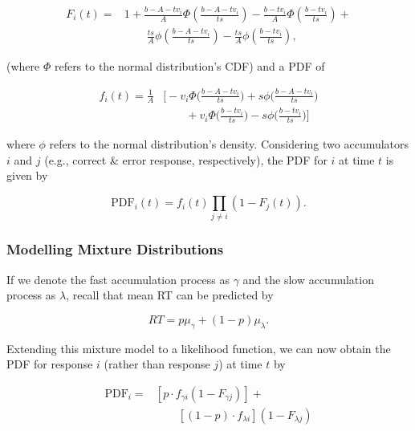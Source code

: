 \documentclass[a4paper, jou, natbib]{apa6}
\begin{document}
\begin{equation}
\begin{aligned}
F_{i}(t) = & 1 + \frac{b - A - tv_{i}}{A} \Phi\left(\frac{b - A - tv_{i}}{ts}\right) - 
\frac{b - tv_{i}}{A} \Phi\left(\frac{b - tv_{i}}{ts}\right) + \\ 
&\qquad \frac{ts}{A} \phi \left(\frac{b - A - tv_{i}}{ts}\right) - \frac{ts}{A} \phi \left(\frac{b - tv_{i}}{ts}\right),
\end{aligned}
\label{eq:lbaCDF}
\end{equation}

\noindent (where $\Phi$ refers to the normal distribution's CDF) and a PDF of 

\begin{equation}
\begin{aligned}
f_{i}(t) = \frac{1}{A} & \Biggl[-v_{i}\Phi \Biggl(\frac{b - A - tv_{i}}{ts}\Biggr) + s\phi\Biggl(\frac{b - A - tv_{i}}{ts}\Biggr) \\
&\qquad + v_{i}\Phi \Biggl(\frac{b - tv_{i}}{ts}\Biggr) - s\phi\Biggl(\frac{b - tv_{i}}{ts}\Biggr)\Biggr] 
\end{aligned}
\label{eq:lbaPDF}
\end{equation}

\noindent where $\phi$ refers to the normal distribution's density. Considering two accumulators $i$ and $j$ (e.g., correct \& error response, respectively), the PDF for $i$ at time $t$ is given by

\begin{equation}
\mbox{PDF}_{i}(t) = f_{i}(t) \prod_{j \neq i} \left(1 - F_{j}(t)\right).
\label{eq:defectivePDF}
\end{equation}


\subsubsection{Modelling Mixture Distributions}
If we denote the fast accumulation process as $\gamma$ and the slow accumulation process as $\lambda$, recall that mean RT can be predicted by

\begin{equation}
RT = p\mu_{\gamma} + (1 - p)\mu_{\lambda}.
\end{equation}

Extending this mixture model to a likelihood function, we can now obtain the PDF for response $i$ (rather than response $j$) at time $t$ by 

\begin{equation}
\begin{aligned}
\mbox{PDF}_{i} = &\left[p \cdot f_{\gamma i}(1 - F_{\gamma j})\right] + \\ 
&\qquad \left[(1 - p) \cdot f_{\lambda i}\right] (1 - F_{\lambda j})
\end{aligned}
\label{eq:tdLikelihood}
\end{equation}



\end{document}
